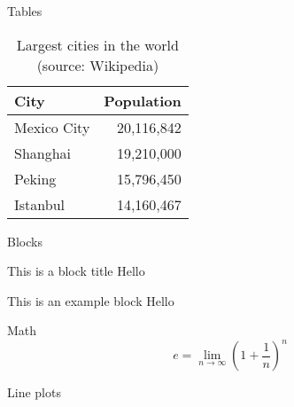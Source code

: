 \documentclass[aspectratio=169]{beamer}
\begin{document}
\begin{frame}{Tables}
  \begin{table}
    \caption{Largest cities in the world (source: Wikipedia)}
    \begin{tabular}{lr}
      \toprule
      City & Population\\
      \midrule
      Mexico City & 20,116,842\\
      Shanghai & 19,210,000\\
      Peking & 15,796,450\\
      Istanbul & 14,160,467\\
      \bottomrule
    \end{tabular}
  \end{table}
\end{frame}
\begin{frame}{Blocks}

  \begin{block}{This is a block title}
    Hello
  \end{block}

  \begin{exampleblock}{This is an example block}
    Hello
  \end{exampleblock}



\end{frame}
\begin{frame}{Math}
  \begin{equation*}
    e = \lim_{n\to \infty} \left(1 + \frac{1}{n}\right)^n
  \end{equation*}
\end{frame}

\begin{frame}{Line plots}
\begin{center}
\end{center}


\end{frame}
\end{document}
